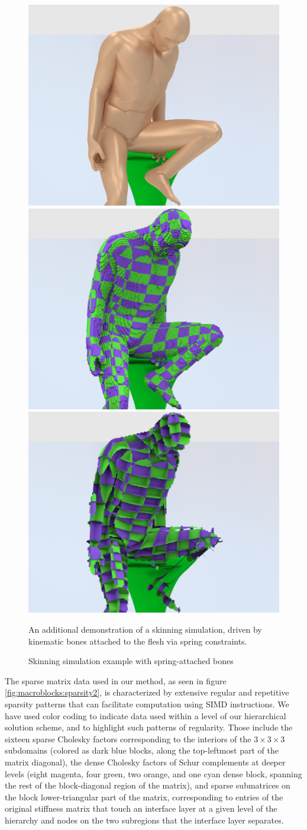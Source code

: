 \begin{figure}[t!] \begin{center} \includegraphics[width=.31\textwidth]{chapter_macroblocks/images/skinning2_skin.png} \includegraphics[width=.31\textwidth]{chapter_macroblocks/images/skinning2_macroblocks.png} \includegraphics[width=.31\textwidth]
    {chapter_macroblocks/images/skinning2_interface.png} \end{center}
  \caption{Skinning simulation example with
    spring-attached bones}{An additional demonstration of a skinning
    simulation, driven by kinematic bones attached to the flesh via
    spring constraints.}
  \label{fig:macroblocks:skinning2-example} \end{figure}

The sparse matrix data used in our method, as seen in figure
\ref{fig:macroblocks:sparsity2}, is characterized by extensive regular and
repetitive sparsity patterns that can facilitate computation using
SIMD instructions. We have used color coding to indicate data used
within a level of our hierarchical solution scheme, and to highlight
such patterns of regularity. Those include the sixteen sparse Cholesky
factors corresponding to the interiors of the $3\times 3\times 3$
subdomains (colored as dark blue blocks, along the top-leftmost part
of the matrix diagonal), the dense Cholesky factors of Schur
complements at deeper levels (eight magenta, four green, two orange,
and one cyan dense block, spanning the rest of the block-diagonal
region of the matrix), and sparse submatrices on the block
lower-triangular part of the matrix, corresponding to entries of the
original stiffness matrix that touch an interface layer at a given
level of the hierarchy and nodes on the two subregions that the
interface layer separates.

